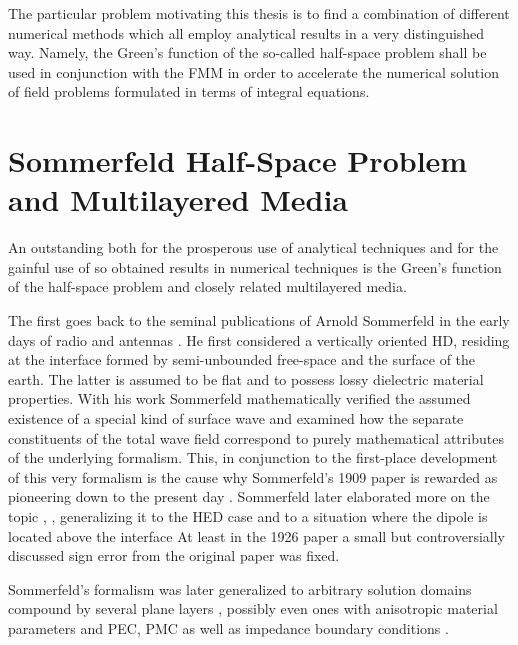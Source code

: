 The particular problem motivating this thesis is to find a combination of
different numerical methods which all employ analytical results in a very
distinguished way. Namely, the Green's function of the so-called half-space
problem shall be used in conjunction with the \ac{FMM} in order to accelerate
the numerical solution of field problems formulated in terms of integral
equations.








\section{Sommerfeld Half-Space Problem and Multilayered Media}

An outstanding both for the prosperous use of analytical techniques and for the
gainful use of so obtained results in numerical techniques is the Green's 
function of the half-space problem and closely related multilayered media.

The first goes back to the seminal publications of Arnold Sommerfeld in the
early days of radio and antennas \cite{Sommerfeld1909}.
He first considered a vertically oriented \ac{HD}, residing at the interface
formed by semi-unbounded free-space and the surface of the earth.
The latter is assumed to be flat and to possess lossy dielectric material
properties.
With his work Sommerfeld mathematically verified the assumed existence of
a special kind of surface wave \cite{Zenneck1907} and examined how the separate
constituents of the total wave field correspond to purely mathematical
attributes of the underlying formalism.
This, in conjunction to the first-place development of this very formalism is
the cause why Sommerfeld's 1909 paper is rewarded as pioneering down to the
present day \cite{Michalski2015, Michalski2016b, Mosig2021}.
Sommerfeld later elaborated more on the topic
\cite{Sommerfeld1926,Sommerfeld1964}, \eg, generalizing it to the \ac{HED}
case and to a situation where the dipole is located above the interface
At least in the 1926 paper \cite{Sommerfeld1926} a small but controversially
discussed sign error from the original paper \cite{Wait1998} was fixed.

Sommerfeld's formalism was later generalized to arbitrary solution domains
compound by several plane layers \cite{Felsen1994, Michalski1990},
possibly even ones with anisotropic material parameters and \ac{PEC}, \ac{PMC}
as well as impedance boundary conditions \cite{Hsu1993, Michalski2005}.

